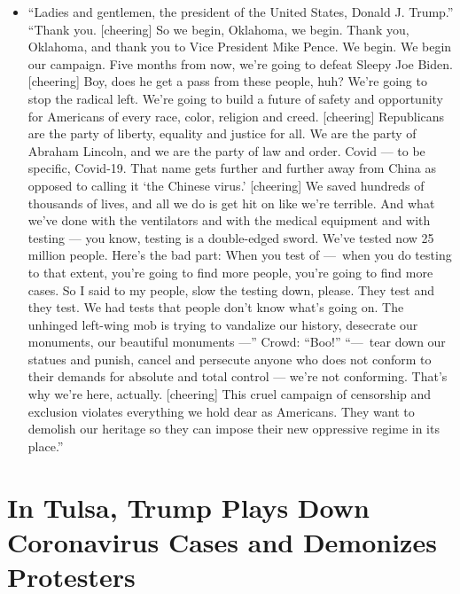 \begin{itemize}
\tightlist
\item
  ``Ladies and gentlemen, the president of the United States, Donald J.
  Trump.'' ``Thank you. {[}cheering{]} So we begin, Oklahoma, we begin.
  Thank you, Oklahoma, and thank you to Vice President Mike Pence. We
  begin. We begin our campaign. Five months from now, we're going to
  defeat Sleepy Joe Biden. {[}cheering{]} Boy, does he get a pass from
  these people, huh? We're going to stop the radical left. We're going
  to build a future of safety and opportunity for Americans of every
  race, color, religion and creed. {[}cheering{]} Republicans are the
  party of liberty, equality and justice for all. We are the party of
  Abraham Lincoln, and we are the party of law and order. Covid --- to
  be specific, Covid-19. That name gets further and further away from
  China as opposed to calling it `the Chinese virus.' {[}cheering{]} We
  saved hundreds of thousands of lives, and all we do is get hit on like
  we're terrible. And what we've done with the ventilators and with the
  medical equipment and with testing --- you know, testing is a
  double-edged sword. We've tested now 25 million people. Here's the bad
  part: When you test of ---~when you do testing to that extent, you're
  going to find more people, you're going to find more cases. So I said
  to my people, slow the testing down, please. They test and they test.
  We had tests that people don't know what's going on. The unhinged
  left-wing mob is trying to vandalize our history, desecrate our
  monuments, our beautiful monuments ---'' Crowd: ``Boo!'' ``---~tear
  down our statues and punish, cancel and persecute anyone who does not
  conform to their demands for absolute and total control --- we're not
  conforming. That's why we're here, actually. {[}cheering{]} This cruel
  campaign of censorship and exclusion violates everything we hold dear
  as Americans. They want to demolish our heritage so they can impose
  their new oppressive regime in its place.''
\end{itemize}

\hypertarget{in-tulsa-trump-plays-down-coronavirus-cases-and-demonizes-protesters-1}{%
\section{In Tulsa, Trump Plays Down Coronavirus Cases and Demonizes
Protesters}\label{in-tulsa-trump-plays-down-coronavirus-cases-and-demonizes-protesters-1}}

